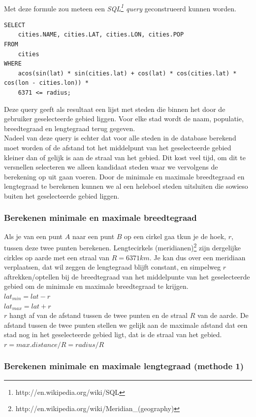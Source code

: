 \documentclass[twoside,openright]{uva-bachelor-thesis}
\begin{document}
		\\[0.5cm]
		Met deze formule zou meteen een \textit{SQL\footnote{http://en.wikipedia.org/wiki/SQL} query} geconstrueerd kunnen worden.
\begin{verbatim}
SELECT
    cities.NAME, cities.LAT, cities.LON, cities.POP
FROM 
    cities 
WHERE 
    acos(sin(lat) * sin(cities.lat) + cos(lat) * cos(cities.lat) * cos(lon - cities.lon)) * 
    6371 <= radius;
\end{verbatim}
		Deze query geeft als resultaat een lijst met steden die binnen het door de gebruiker geselecteerde gebied liggen. Voor elke stad wordt de naam, populatie, breedtegraad en lengtegraad terug gegeven.
		\\[0.5cm]
		Nadeel van deze query is echter dat voor alle steden in de database berekend moet worden of de afstand tot het middelpunt van het geselecteerde gebied kleiner dan of gelijk is aan de straal van het gebied. Dit kost veel tijd, om dit te versnellen selecteren we alleen kandidaat steden waar we vervolgens de berekening op uit gaan voeren. Door de minimale en maximale breedtegraad en lengtegraad te berekenen kunnen we al een heleboel steden uitsluiten die sowieso buiten het geselecteerde gebied liggen.
		\subsubsection{Berekenen minimale en maximale breedtegraad}
		Als je van een punt $A$ naar een punt $B$ op een cirkel gaa tkun je de hoek, $r$, tussen deze twee punten berekenen. Lengtecirkels (meridianen)\footnote{http://en.wikipedia.org/wiki/Meridian\_(geography)} zijn dergelijke cirkles op aarde met een straal van $R = 6371km$. Je kan dus over een meridiaan verplaatsen, dat wil zeggen de lengtegraad blijft constant, en simpelweg $r$ aftrekken/optellen bij de breedtegraad van het middelpunte van het geselecteerde gebied om de minimale en maximale breedtegraad te krijgen.
		\\[0.5cm]
		$lat_{min} = lat - r$ \\
		$lat_{max} = lat + r$
		\\[0.5cm]
		$r$ hangt af van de afstand tussen de twee punten en de straal $R$ van de aarde. De afstand tussen de twee punten stellen we gelijk aan de maximale afstand dat een stad nog in het geselecteerde gebied ligt, dat is de straal van het gebied.
		\\[0.5cm]
		$r = max. distance / R = radius / R$
		\subsubsection{Berekenen minimale en maximale lengtegraad (methode 1)}
\end{document}
